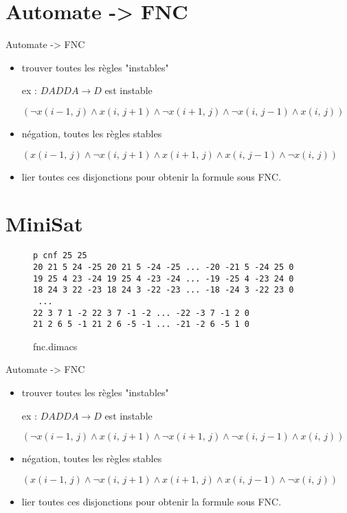 \documentclass[10pt]{beamer}
\begin{document}
\section{Automate -> FNC}

\begin{frame}{Automate -> FNC}
	\begin{itemize}[<+- | alert@+>]
		\item trouver toutes les règles "instables"
		
		ex : $DADDA \rightarrow D$ est instable
		
		 $(\neg x(i-1,\, j) \wedge x(i,\, j+1) \wedge \neg x(i+1,\, j) \wedge \neg x(i,\, j-1) \wedge x(i,\, j))$
		 
		\item négation, toutes les règles stables
		
		$( x(i-1,\, j) \wedge \neg x(i,\, j+1) \wedge x(i+1,\, j) \wedge x(i,\, j-1) \wedge \neg x(i,\, j))$
		
		\item lier toutes ces disjonctions pour obtenir la formule sous FNC.
		
	\end{itemize}
\end{frame}


\section{MiniSat}

\begin{frame}[fragile]
\begin{figure}
\caption{fnc.dimacs}
\begin{lstlisting}
p cnf 25 25
20 21 5 24 -25 20 21 5 -24 -25 ... -20 -21 5 -24 25 0
19 25 4 23 -24 19 25 4 -23 -24 ... -19 -25 4 -23 24 0
18 24 3 22 -23 18 24 3 -22 -23 ... -18 -24 3 -22 23 0
 ...
22 3 7 1 -2 22 3 7 -1 -2 ... -22 -3 7 -1 2 0
21 2 6 5 -1 21 2 6 -5 -1 ... -21 -2 6 -5 1 0
\end{lstlisting}
\end{figure}
\end{frame}

\begin{frame}{Automate -> FNC}
	\begin{itemize}[<+- | alert@+>]
		\item trouver toutes les règles "instables"
		
		ex : $DADDA \rightarrow D$ est instable
		
		 $(\neg x(i-1,\, j) \wedge x(i,\, j+1) \wedge \neg x(i+1,\, j) \wedge \neg x(i,\, j-1) \wedge x(i,\, j))$
		 
		\item négation, toutes les règles stables
		
		$( x(i-1,\, j) \wedge \neg x(i,\, j+1) \wedge x(i+1,\, j) \wedge x(i,\, j-1) \wedge \neg x(i,\, j))$
		
		\item lier toutes ces disjonctions pour obtenir la formule sous FNC.
		
	\end{itemize}
\end{frame}
\end{document}
